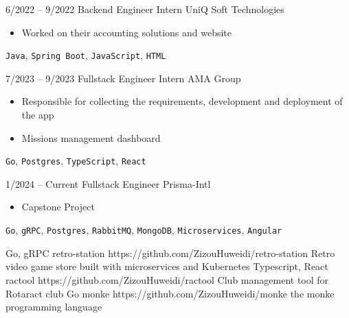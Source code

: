 \documentclass[9pt]{developercv} %
\begin{document}
\vspace{-10 pt}
\begin{entrylist}
	\entry
        {6/2022 -- 9/2022}
		{Backend Engineer Intern}
		{UniQ Soft Technologies}
		{\vspace{-10pt}
        \begin{itemize}[noitemsep,topsep=0pt,parsep=0pt,partopsep=0pt, leftmargin=-1pt]
            \item Worked on their accounting solutions and website
        \end{itemize} 
        \texttt{Java}, \texttt{Spring Boot}, \texttt{JavaScript}, \texttt{HTML}}
	\entry
		{7/2023 -- 9/2023}
		{Fullstack Engineer Intern}
		{AMA Group}
		{\vspace{-10pt}
        \begin{itemize}[noitemsep,topsep=0pt,parsep=0pt,partopsep=0pt, leftmargin=-1pt]
            \item Responsible for collecting the requirements, development and deployment of the app
            \item Missions management dashboard
        \end{itemize} 
        \texttt{Go}, \texttt{Postgres}, \texttt{TypeScript}, \texttt{React}}
	\entry
		{1/2024 -- Current}
		{Fullstack Engineer}
		{Prisma-Intl}
		{\vspace{-10pt}
        \begin{itemize}[noitemsep,topsep=0pt,parsep=0pt,partopsep=0pt, leftmargin=-1pt]
            \item Capstone Project
        \end{itemize} 
        \texttt{Go}, \texttt{gRPC}, \texttt{Postgres}, \texttt{RabbitMQ}, \texttt{MongoDB}, \texttt{Microservices}, \texttt{Angular}}
\end{entrylist}

\begin{entrylist}
    \entry
		{Go, gRPC}
		{retro-station}
		{https://github.com/ZizouHuweidi/retro-station}
		{Retro video game store built with microservices and Kubernetes}
    \entry
		{Typescript, React}
		{ractool}
		{https://github.com/ZizouHuweidi/ractool}
		{Club management tool for Rotaract club}
	\entry
		{Go}
		{monke}
		{https://github.com/ZizouHuweidi/monke}
		{the monke programming language}
\end{entrylist}
\end{document}
